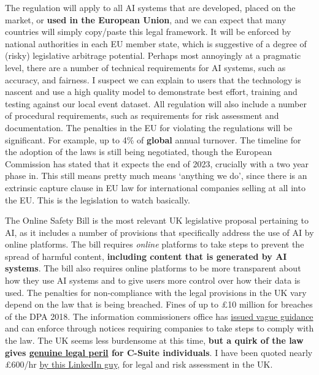 The regulation will apply to all AI systems that are developed, placed on the market, or \textbf{used in the European Union}, and we can expect that many countries will simply copy/paste this legal framework. It will be enforced by national authorities in each EU member state, which is suggestive of a degree of (risky) legislative arbitrage potential. Perhaps most annoyingly at a pragmatic level, there are a number of technical requirements for AI systems, such as accuracy, and fairness. I suspect we can explain to users that the technology is nascent and use a high quality model to demonstrate best effort, training and testing against our local event dataset. All regulation will also include a number of procedural requirements, such as requirements for risk assessment and documentation. The penalties in the EU for violating the regulations will be significant. For example, up to 4\% of \textbf{global} annual turnover. The timeline for the adoption of the laws is still being negotiated, though the European Commission has stated that it expects the end of 2023, crucially with a two year phase in. This still means pretty much means `anything we do', since there is an extrinsic capture clause in EU law for international companies selling at all into the EU. This is the legislation to watch basically.\par
The Online Safety Bill is the most relevant UK legislative proposal pertaining to AI, as it includes a number of provisions that specifically address the use of AI by online platforms. The bill requires \textit{online} platforms to take steps to prevent the spread of harmful content, \textbf{including content that is generated by AI systems}. The bill also requires online platforms to be more transparent about how they use AI systems and to give users more control over how their data is used. The penalties for non-compliance with the legal provisions in the UK vary depend on the law that is being breached. Fines of up to £10 million for breaches of the DPA 2018. The information commissioners office has \href{https://ico.org.uk/for-organisations/uk-gdpr-guidance-and-resources/artificial-intelligence/guidance-on-ai-and-data-protection/how-should-we-assess-security-and-data-minimisation-in-ai/}{issued vague guidance} and can enforce through notices requiring companies to take steps to comply with the law. The UK seems less burdensome at this time, \textbf{but a quirk of the law gives \href{https://webdevlaw.uk/2022/11/21/a-quick-hypothetical-situation-or-your-crash-introduction-to-the-real-world/}{genuine legal peril} for C-Suite individuals}. I have been quoted nearly £600/hr \href{https://www.linkedin.com/in/barry-scannell-bbb5aa207/}{by this LinkedIn guy}, for legal and risk assessment in the UK.\par
